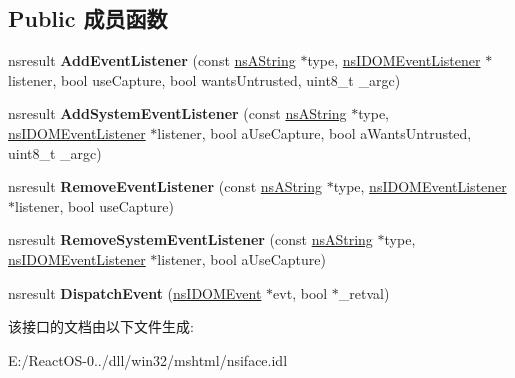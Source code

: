 \subsection*{Public 成员函数}
\begin{DoxyCompactItemize}
\item 
\mbox{\label{interfacens_i_d_o_m_event_target_a7edcfbe7c65cc95cb4bf43c2b6b8979a}} 
nsresult {\bfseries Add\+Event\+Listener} (const \hyperlink{structns_string_container}{ns\+A\+String} $\ast$type, \hyperlink{interfacens_i_d_o_m_event_listener}{ns\+I\+D\+O\+M\+Event\+Listener} $\ast$listener, bool use\+Capture, bool wants\+Untrusted, uint8\+\_\+t \+\_\+argc)
\item 
\mbox{\label{interfacens_i_d_o_m_event_target_a276d1d68dcaf6752fdc088325a354f2c}} 
nsresult {\bfseries Add\+System\+Event\+Listener} (const \hyperlink{structns_string_container}{ns\+A\+String} $\ast$type, \hyperlink{interfacens_i_d_o_m_event_listener}{ns\+I\+D\+O\+M\+Event\+Listener} $\ast$listener, bool a\+Use\+Capture, bool a\+Wants\+Untrusted, uint8\+\_\+t \+\_\+argc)
\item 
\mbox{\label{interfacens_i_d_o_m_event_target_afd27cc5c175458ccfef7c55f881b686b}} 
nsresult {\bfseries Remove\+Event\+Listener} (const \hyperlink{structns_string_container}{ns\+A\+String} $\ast$type, \hyperlink{interfacens_i_d_o_m_event_listener}{ns\+I\+D\+O\+M\+Event\+Listener} $\ast$listener, bool use\+Capture)
\item 
\mbox{\label{interfacens_i_d_o_m_event_target_a4b2ec81054cc22bacf2999676fd9ce32}} 
nsresult {\bfseries Remove\+System\+Event\+Listener} (const \hyperlink{structns_string_container}{ns\+A\+String} $\ast$type, \hyperlink{interfacens_i_d_o_m_event_listener}{ns\+I\+D\+O\+M\+Event\+Listener} $\ast$listener, bool a\+Use\+Capture)
\item 
\mbox{\label{interfacens_i_d_o_m_event_target_a74481fd06e88d83434bc9677c9d85d33}} 
nsresult {\bfseries Dispatch\+Event} (\hyperlink{interfacens_i_d_o_m_event}{ns\+I\+D\+O\+M\+Event} $\ast$evt, bool $\ast$\+\_\+retval)
\end{DoxyCompactItemize}


该接口的文档由以下文件生成\+:\begin{DoxyCompactItemize}
\item 
E\+:/\+React\+O\+S-\/0../dll/win32/mshtml/nsiface.\+idl\end{DoxyCompactItemize}
